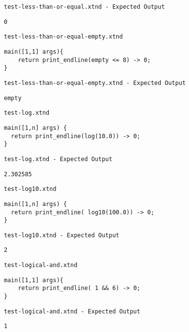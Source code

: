 \medskip \noindent \texttt{test-less-than-or-equal.xtnd - Expected Output}


\begin{lstlisting}
0
\end{lstlisting}


\medskip \noindent \texttt{test-less-than-or-equal-empty.xtnd}


\begin{lstlisting}
main([1,1] args){
	return print_endline(empty <= 8) -> 0;
}
\end{lstlisting}


\medskip \noindent \texttt{test-less-than-or-equal-empty.xtnd - Expected Output}


\begin{lstlisting}
empty
\end{lstlisting}


\medskip \noindent \texttt{test-log.xtnd}


\begin{lstlisting}
main([1,n] args) {
  return print_endline(log(10.0)) -> 0;
}
\end{lstlisting}


\medskip \noindent \texttt{test-log.xtnd - Expected Output}


\begin{lstlisting}
2.302585
\end{lstlisting}


\medskip \noindent \texttt{test-log10.xtnd}


\begin{lstlisting}
main([1,n] args) {
  return print_endline( log10(100.0)) -> 0;
}
\end{lstlisting}


\medskip \noindent \texttt{test-log10.xtnd - Expected Output}


\begin{lstlisting}
2
\end{lstlisting}


\medskip \noindent \texttt{test-logical-and.xtnd}


\begin{lstlisting}
main([1,1] args){
	return print_endline( 1 && 6) -> 0;
}
\end{lstlisting}


\medskip \noindent \texttt{test-logical-and.xtnd - Expected Output}


\begin{lstlisting}
1
\end{lstlisting}


